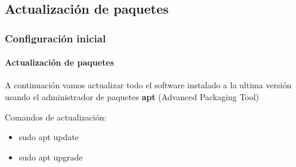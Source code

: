 \documentclass{beamer}
\begin{document}
	\subsection{Actualización de paquetes}
	\begin{frame}
		\frametitle{Configuración inicial}
		\framesubtitle{Actualización de paquetes}
		A continuación vamos actualizar todo el software instalado a la ultima versión usando el administrador de paquetes \textbf{apt} (Advanced Packaging Tool)
		\begin{mybox}{Comandos de actualización:}
			\begin{itemize}
				\item sudo apt update
				\item sudo apt upgrade
			\end{itemize}
		\end{mybox}
	\end{frame}
\end{document}
